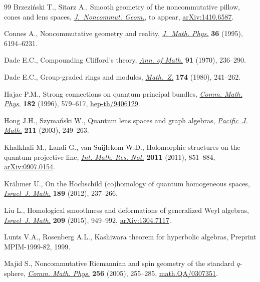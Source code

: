 \begin{thebibliography}{99}
Brzezi{\'n}ski T., Sitarz A., Smooth geometry of the noncommutative pillow,
 cones and lens spaces, \href{http://dx.doi.org/10.4171/JNCG/56}{\textit{J.~Noncommut. Geom.}}, {t}o appear,
 \href{http://arxiv.org/abs/1410.6587}{arXiv:1410.6587}.

Connes A., Noncommutative geometry and reality, \href{http://dx.doi.org/10.1063/1.531241}{\textit{J.~Math. Phys.}}
 \textbf{36} (1995), 6194--6231.

Dade E.C., Compounding {C}lif\/ford's theory, \href{http://dx.doi.org/10.2307/1970606}{\textit{Ann. of Math.}} \textbf{91}
 (1970), 236--290.

Dade E.C., Group-graded rings and modules, \href{http://dx.doi.org/10.1007/BF01161413}{\textit{Math.~Z.}} \textbf{174}
 (1980), 241--262.

Hajac P.M., Strong connections on quantum principal bundles, \href{http://dx.doi.org/10.1007/BF02506418}{\textit{Comm.
 Math. Phys.}} \textbf{182} (1996), 579--617, \href{http://arxiv.org/abs/hep-th/9406129}{hep-th/9406129}.

Hong J.H., Szyma{\'n}ski W., Quantum lens spaces and graph algebras,
 \href{http://dx.doi.org/10.2140/pjm.2003.211.249}{\textit{Pacific~J. Math.}} \textbf{211} (2003), 249--263.

Khalkhali M., Landi G., van Suijlekom W.D., Holomorphic structures on the
 quantum projective line, \href{http://dx.doi.org/10.1093/imrn/rnq097}{\textit{Int. Math. Res. Not.}} \textbf{2011} (2011),
 851--884, \href{http://arxiv.org/abs/0907.0154}{arXiv:0907.0154}.

Kr{\"a}hmer U., On the {H}ochschild (co)homology of quantum homogeneous spaces,
 \href{http://dx.doi.org/10.1007/s11856-011-0168-4}{\textit{Israel~J. Math.}} \textbf{189} (2012), 237--266.

Liu L., Homological smoothness and deformations of generalized {W}eyl algebras,
 \href{http://dx.doi.org/10.1007/s11856-015-1242-0}{\textit{Israel~J. Math.}} \textbf{209} (2015), 949--992, \href{http://arxiv.org/abs/1304.7117}{arXiv:1304.7117}.

Lunts V.A., Rosenberg A.L., Kashiwara theorem for hyperbolic algebras,
 {P}reprint MPIM-1999-82, 1999.

Majid S., Noncommutative {R}iemannian and spin geometry of the standard
 {$q$}-sphere, \href{http://dx.doi.org/10.1007/s00220-005-1295-8}{\textit{Comm. Math. Phys.}} \textbf{256} (2005), 255--285,
 \href{http://arxiv.org/abs/math.QA/0307351}{math.QA/0307351}.


\end{thebibliography}
